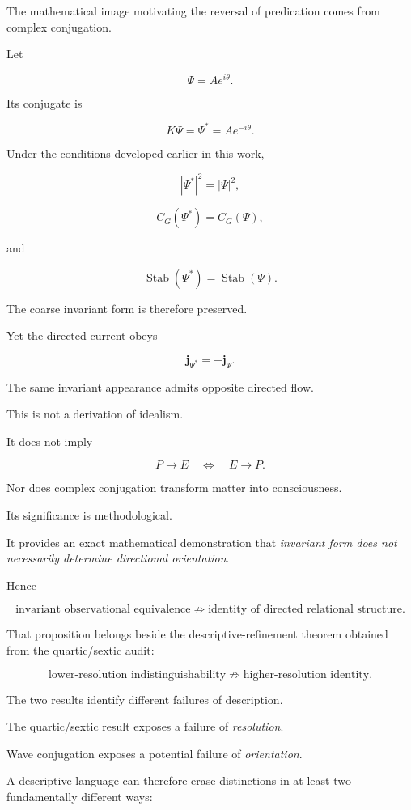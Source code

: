 The mathematical image motivating the reversal of predication comes from complex conjugation.

Let

\[
\Psi=Ae^{i\theta}.
\]

Its conjugate is

\[
K\Psi
=
\Psi^\ast
=
Ae^{-i\theta}.
\]

Under the conditions developed earlier in this work,

\[
|\Psi^\ast|^2
=
|\Psi|^2,
\]

\[
C_G(\Psi^\ast)
=
C_G(\Psi),
\]

and

\[
\operatorname{Stab}(\Psi^\ast)
=
\operatorname{Stab}(\Psi).
\]

The coarse invariant form is therefore preserved.

Yet the directed current obeys

\[
\boxed{
\mathbf j_{\Psi^\ast}
=
-\mathbf j_\Psi.
}
\]

The same invariant appearance admits opposite directed flow.

This is not a derivation of idealism.

It does not imply

\[
P\rightarrow E
\quad\Longleftrightarrow\quad
E\rightarrow P.
\]

Nor does complex conjugation transform matter into consciousness.

Its significance is methodological.

It provides an exact mathematical demonstration that \emph{invariant form does not necessarily determine directional orientation}.

Hence

\[
\boxed{
\text{invariant observational equivalence}
\not\Rightarrow
\text{identity of directed relational structure}.
}
\]

That proposition belongs beside the descriptive-refinement theorem obtained from the quartic/sextic audit:

\[
\boxed{
\text{lower-resolution indistinguishability}
\not\Rightarrow
\text{higher-resolution identity}.
}
\]

The two results identify different failures of description.

The quartic/sextic result exposes a failure of \emph{resolution}.

Wave conjugation exposes a potential failure of \emph{orientation}.

A descriptive language can therefore erase distinctions in at least two fundamentally different ways:

